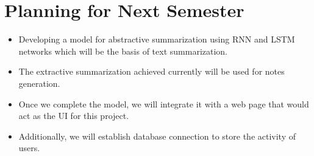 \chapter{Planning for Next Semester}

\begin{itemize}
\item Developing a model for abstractive summarization using RNN and LSTM networks which will be the basis of text summarization. 
\item The extractive summarization achieved currently will be used for notes generation.
\item Once we complete the model, we will integrate it with a web page that would act as the UI for this project.
\item Additionally, we will establish database connection to store the activity of users.
\end{itemize}

